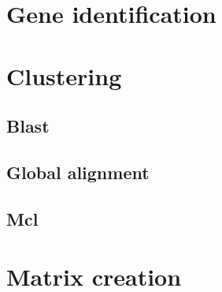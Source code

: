 \section{Gene identification}
\section{Clustering}
\subsection{Blast}
\subsection{Global alignment}
\subsection{Mcl}
\section{Matrix creation}
